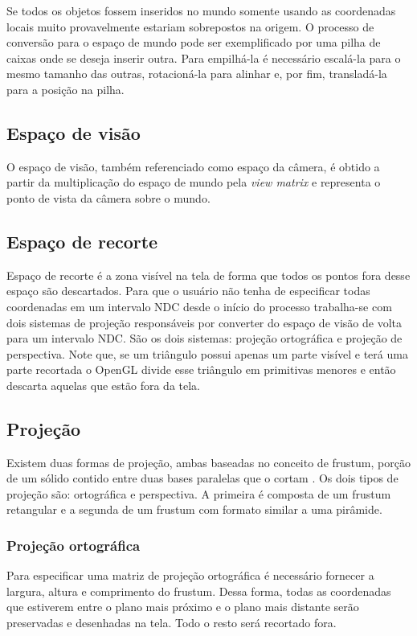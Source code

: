 \documentclass[12pt, 
openright, 
oneside, 
a4paper,    
brazil]{facom-ufu-abntex2}
\begin{document}
Se todos os objetos fossem inseridos no mundo somente usando as coordenadas locais muito provavelmente estariam sobrepostos na origem. O processo de conversão para o espaço de mundo pode ser exemplificado por uma pilha de caixas onde se deseja inserir outra. Para empilhá-la é necessário escalá-la para o mesmo tamanho das outras, rotacioná-la para alinhar e, por fim, transladá-la para a posição na pilha.

\subsection{Espaço de visão}
O espaço de visão, também referenciado como espaço da câmera, é obtido a partir da multiplicação do espaço de mundo pela \textit{view matrix} e representa o ponto de vista da câmera sobre o mundo.

\subsection{Espaço de recorte}
Espaço de recorte é a zona visível na tela de forma que todos os pontos fora desse espaço são descartados. Para que o usuário não tenha de especificar todas coordenadas em um intervalo NDC desde o início do processo trabalha-se com dois sistemas de projeção responsáveis por converter do espaço de visão de volta para um intervalo NDC. São os dois sistemas: projeção ortográfica e projeção de perspectiva.
Note que, se um triângulo possui apenas um parte visível e terá uma parte recortada o OpenGL divide esse triângulo em primitivas menores e então descarta aquelas que estão fora da tela.

\subsection{Projeção}

Existem duas formas de projeção, ambas baseadas no conceito de frustum, porção de um sólido contido entre duas bases paralelas que o cortam \cite{Frustum}. Os dois tipos de projeção são: ortográfica e perspectiva. A primeira é composta de um frustum retangular e a segunda de um frustum com formato similar a uma pirâmide.

\subsubsection{Projeção ortográfica}

Para especificar uma matriz de projeção ortográfica é necessário fornecer a largura, altura e comprimento do frustum. Dessa forma, todas as coordenadas que estiverem entre o plano mais próximo e o plano mais distante serão preservadas e desenhadas na tela. Todo o resto será recortado fora.
\end{document}
